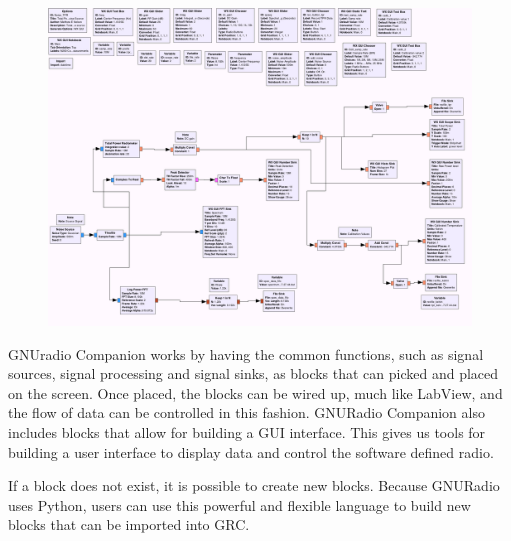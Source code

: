 {\begin{figure}[h!tb] \centering
\includegraphics[width=\textwidth]{Images/noisesrc_radiometer.png}
\label{N200_GRC}
\end{figure}
}

GNUradio Companion works by having the common functions, such as signal sources, signal processing and signal sinks, as blocks that can picked and placed on the screen.  Once placed, the blocks can be wired up, much like LabView, and the flow of data can be controlled in this fashion.  GNURadio Companion also includes blocks that allow for building a GUI interface.  This gives us tools for building a user interface to display data and control the software defined radio.

If a block does not exist, it is possible to create new blocks.  Because GNURadio uses Python, users can use this powerful and flexible language to build new blocks that can be imported into GRC.  



